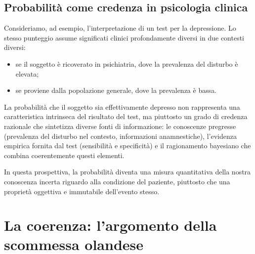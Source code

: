 \documentclass[
  letterpaper,
  DIV=11,
  numbers=noendperiod,
  oneside]{scrreprt}
\providecommand{\tightlist}{%
  \setlength{\itemsep}{0pt}\setlength{\parskip}{0pt}}
\theoremstyle{definition}
\theoremstyle{plain}
\theoremstyle{definition}
\theoremstyle{remark}
\begin{document}
\begin{tcolorbox}[enhanced jigsaw, arc=.35mm, breakable, colbacktitle=quarto-callout-note-color!10!white, opacityback=0, toprule=.15mm, rightrule=.15mm, colback=white, opacitybacktitle=0.6, leftrule=.75mm, coltitle=black, bottomtitle=1mm, left=2mm, toptitle=1mm, title=\textcolor{quarto-callout-note-color}{\faInfo}\hspace{0.5em}{Esempio: la diagnosi clinica}, titlerule=0mm, bottomrule=.15mm, colframe=quarto-callout-note-color-frame]

\subsection{Probabilità come credenza in psicologia
clinica}\label{probabilituxe0-come-credenza-in-psicologia-clinica}

Consideriamo, ad esempio, l'interpretazione di un test per la
depressione. Lo stesso punteggio assume significati clinici
profondamente diversi in due contesti diversi:

\begin{itemize}
\tightlist
\item
  se il soggetto è ricoverato in psichiatria, dove la prevalenza del
  disturbo è elevata;
\item
  se proviene dalla popolazione generale, dove la prevalenza è bassa.
\end{itemize}

La probabilità che il soggetto sia effettivamente depresso non
rappresenta una caratteristica intrinseca del risultato del test, ma
piuttosto un grado di credenza razionale che sintetizza diverse fonti di
informazione: le conoscenze pregresse (prevalenza del disturbo nel
contesto, informazioni anamnestiche), l'evidenza empirica fornita dal
test (sensibilità e specificità) e il ragionamento bayesiano che combina
coerentemente questi elementi.

In questa prospettiva, la probabilità diventa una misura quantitativa
della nostra conoscenza incerta riguardo alla condizione del paziente,
piuttosto che una proprietà oggettiva e immutabile dell'evento stesso.

\end{tcolorbox}

\section{La coerenza: l'argomento della scommessa
olandese}\label{la-coerenza-largomento-della-scommessa-olandese}
\end{document}
